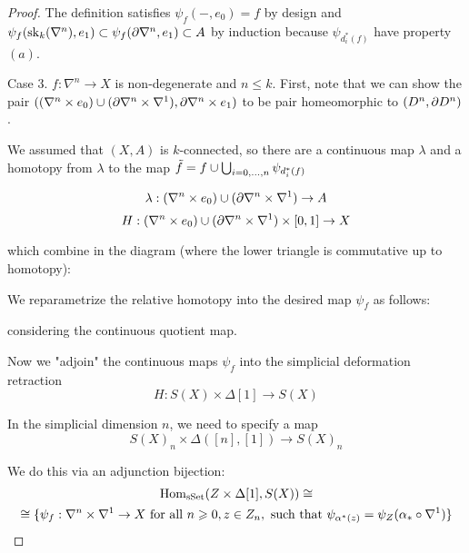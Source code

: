 \begin{proof}
The definition satisfies $\psi_f(-,e_0)=f$ by design and $\psi_f(\operatorname{sk}_k(\nabla^n),e_1)\subset\psi_f(\partial\nabla^n,e_1)\subset A$ by induction because $\psi_{d_i^*(f)}$ have property $(a)$.

Case 3. $f:\nabla^n\to X$ is non-degenerate and $n\leq k$. First, note that we can show the pair $((\nabla^n\times e_0)\cup(\partial\nabla^n\times\nabla^1), \partial\nabla^n\times e_1)$ to be pair homeomorphic to $(D^n,\partial D^n)$.

We assumed that $(X,A)$ is $k$-connected, so there are a continuous map $\lambda$ and a homotopy from $\lambda$ to the map $\tilde f=f\cup\bigcup_{i=0,\dots,n} \psi_{d_i^*(f)}$

\[\lambda:(\nabla^n\times e_0)\cup(\partial\nabla^n\times\nabla^1)\to A\]
\[H:(\nabla^n\times e_0)\cup(\partial\nabla^n\times\nabla^1)\times[0,1]\to X\]

which combine in the diagram (where the lower triangle is commutative up to homotopy):
\begin{center}
\end{center}

We reparametrize the relative homotopy into the desired map $\psi_f$ as follows:
\begin{center}
\end{center}
considering the continuous quotient map.\alvaropls

Now we "adjoin" the continuous maps $\psi_f$ into the simplicial deformation retraction
\[H:S(X)\times\Delta[1]\to S(X)\]

In the simplicial dimension $n$, we need to specify a map
\[S(X)_n\times\Delta([n],[1])\to S(X)_n\]

We do this via an adjunction bijection:
\begin{multline*}
    \operatorname{Hom}_{\mathrm{sSet}}(Z\times\Delta[1],S(X))\cong\\
    \cong\{\psi_f:\nabla^n\times\nabla^1\to X \text{ for all } n\geqslant0, z\in Z_n,\text{ such that } \psi_{\alpha^*(z)}=\psi_Z(\alpha_*\circ\nabla^1)\}
\end{multline*}


\end{proof}
